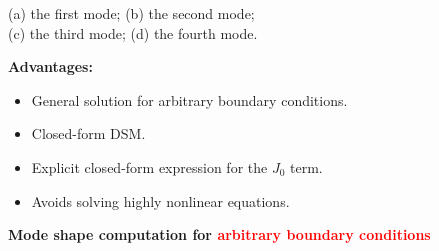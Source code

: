 \documentclass{beamer}
\begin{document}
\begin{frame}
\begin{columns}[T]
\begin{column}{0.31\textwidth}
{{\begin{minipage}{1.2\linewidth}
\begin{minipage}{0.6\linewidth}
\begin{figure}[h!]
							\end{figure}
							\small{ 
								(a) the first mode; (b) the second mode;\\[0.em]\hspace*{-0.cm} (c) the third mode; (d) the fourth mode.}
						\end{minipage}
						\hfill
						\begin{minipage}{0.39\linewidth}
							\centering
							\textbf{Advantages:}
							\begin{itemize}
								\item General solution for arbitrary boundary conditions.
								\item Closed-form DSM.
								\item Explicit closed-form expression for the $J_0$ term.
								\item Avoids solving highly nonlinear equations.
							\end{itemize}
						\end{minipage}%
					\end{minipage}
				}%
			} %
			\vspace{2.5em}   %
			
			{\Large\textbf{Mode shape computation for \textcolor{red}{arbitrary boundary conditions}}}\par\vspace{0.4em}
		\end{column}
		

\end{columns}
\end{frame}
\end{document}
